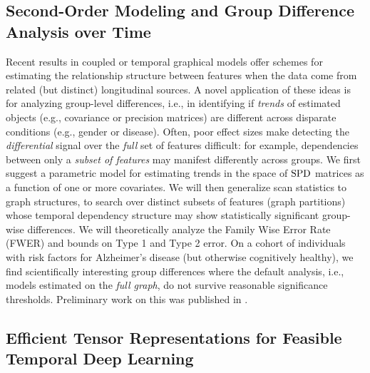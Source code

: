 \subsection{Second-Order Modeling and Group Difference Analysis over Time}

Recent results in coupled or temporal graphical models offer schemes for estimating the relationship structure 
between features when the data come from
related (but distinct) longitudinal sources. A novel application of these ideas is for analyzing group-level differences, i.e., in identifying if {\em trends} of estimated objects (e.g., 
covariance or precision matrices) are different across disparate conditions (e.g., gender or disease). Often, poor effect sizes make detecting the \textit{differential} signal 
over the {\em full} set of features difficult: for example, 
dependencies between only a {\em subset of features} may manifest differently across groups.
We first suggest
a parametric model 
for estimating trends in the space of $\text{SPD}$ matrices as a function of one or more covariates.
We will then generalize scan statistics to graph structures, 
to search over distinct subsets of features (graph partitions) whose temporal dependency structure may show statistically 
significant group-wise differences.
We will theoretically analyze the Family Wise Error Rate (FWER) and bounds on Type 1 and Type 2 error. 
On a cohort of individuals with risk factors for Alzheimer's disease (but otherwise cognitively healthy), 
we 
find scientifically interesting 
group differences where the default analysis, 
i.e., models estimated on the {\em full graph}, do not survive reasonable 
significance thresholds. 
Preliminary work on this was published in \citep{covtraj}.


\subsection{Efficient Tensor Representations for Feasible Temporal Deep Learning}

